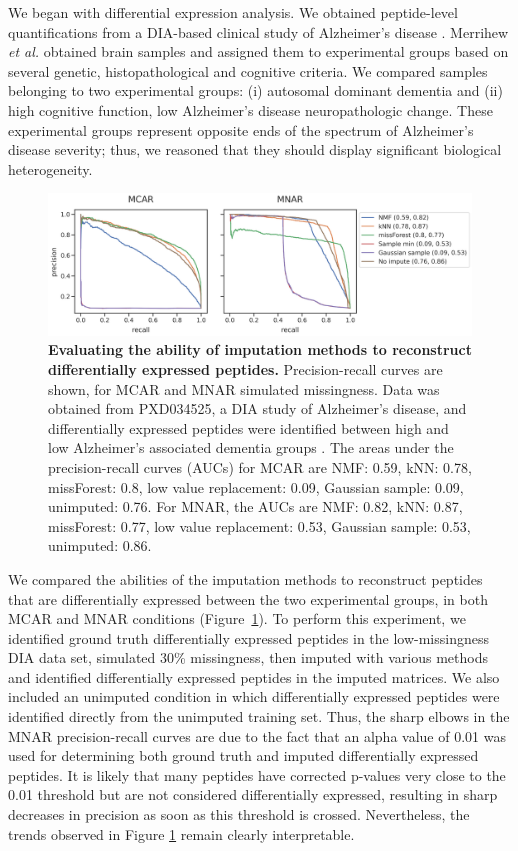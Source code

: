 \documentclass{article}
\begin{document}
We began with differential expression analysis. We obtained peptide-level quantifications from a DIA-based clinical study of Alzheimer's disease \cite{smtg-maccoss}. Merrihew \textit{et al.} obtained brain samples and assigned them to experimental groups based on several genetic, histopathological and cognitive criteria. We compared samples belonging to two experimental groups: (i) autosomal dominant dementia and (ii) high cognitive function, low Alzheimer's disease neuropathologic change. These experimental groups represent opposite ends of the spectrum of Alzheimer's disease severity; thus, we reasoned that they should display significant biological heterogeneity. 

\begin{figure}
  \centering
  \includegraphics[width=1.0\textwidth]{figures/DE-experiment-multipanel1.png}
  \caption{{\bf Evaluating the ability of imputation methods to reconstruct differentially expressed peptides.} Precision-recall curves are shown, for MCAR and MNAR simulated missingness. Data was obtained from PXD034525, a DIA study of Alzheimer's disease, and differentially expressed peptides were identified between high and low Alzheimer's associated dementia groups \cite{smtg-maccoss}. The areas under the precision-recall curves (AUCs) for MCAR are NMF: 0.59, kNN: 0.78, missForest: 0.8, low value replacement: 0.09, Gaussian sample: 0.09, unimputed: 0.76. For MNAR, the AUCs are NMF: 0.82, kNN: 0.87, missForest: 0.77, low value replacement: 0.53, Gaussian sample: 0.53, unimputed: 0.86.}
  \label{fig:PR-curves}
\end{figure}
 
We compared the abilities of the imputation methods to reconstruct peptides that are differentially expressed between the two experimental groups, in both MCAR and MNAR conditions (Figure~\ref{fig:PR-curves}). To perform this experiment, we identified ground truth differentially expressed peptides in the low-missingness DIA data set, simulated 30\% missingness, then imputed with various methods and identified differentially expressed peptides in the imputed matrices. We also included an unimputed condition in which differentially expressed peptides were identified directly from the unimputed training set. Thus, the sharp elbows in the MNAR precision-recall curves are due to the fact that an alpha value of 0.01 was used for determining both ground truth and imputed differentially expressed peptides. It is likely that many peptides have corrected p-values very close to the 0.01 threshold but are not considered differentially expressed, resulting in sharp decreases in precision as soon as this threshold is crossed. Nevertheless, the trends observed in Figure \ref{fig:PR-curves} remain clearly interpretable. 
\end{document}
